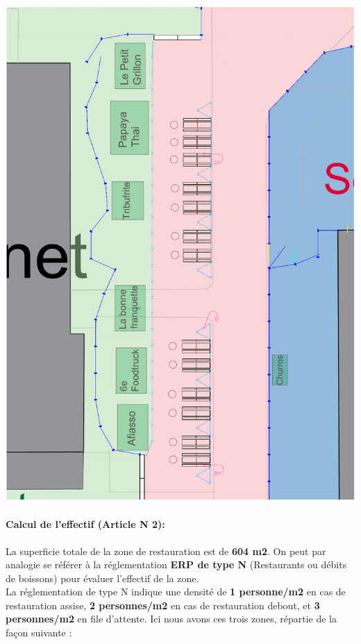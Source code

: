 \documentclass[hidelinks, paper=a4, fontsize=13pt]{report}
\begin{document}
\begin{center}
	\includegraphics[scale=0.45]{Exports/Plan_24h_44eme-Espace_Resto_zoom}
\end{center}

\paragraph{Calcul de l'effectif (Article N 2):}
La superficie totale de la zone de restauration est de \textbf{604 m2}. On peut par analogie se référer à la réglementation \textbf{ERP de type N} (Restaurants ou débits de boissons) pour évaluer l’effectif de la zone. \\

La réglementation de type N indique une densité de \textbf{1 personne/m2} en cas de restauration assise, \textbf{2 personnes/m2} en cas de restauration debout, et \textbf{3 personnes/m2} en file d'attente. Ici nous avons ces trois zones, répartie de la façon suivante :
\end{document}
